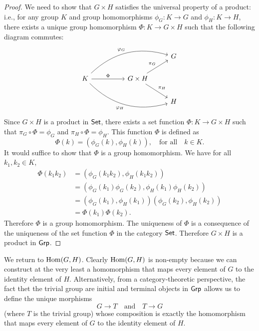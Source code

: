 \begin{proof}
    We need to show that \(G \times H\) satisfies the universal property of a
    product: i.e., for any group \(K\) and group homomorphisms \(\phi_G: K \to
    G\) and \(\phi_H: K \to H\), there exists a unique group homomorphism
    \(\Phi: K \to G \times H\) such that the following diagram commutes:
    \[
        \begin{tikzcd}
            &  &                                                    & G \\
        K \arrow[rr, "\Phi"] \arrow[rrru, "\phi_G", bend left] \arrow[rrrd, "\phi_H"', bend right] &  & G \times H \arrow[rd, "\pi_H"] \arrow[ru, "\pi_G"] &   \\
                    &  &                                                    & H
        \end{tikzcd}
    \]
    Since \(G \times H\) is a product in \(\mathsf{Set}\), there exists a set
    function \(\Phi: K \to G \times H\) such that \(\pi_G \circ \Phi = \phi_G\)
    and \(\pi_H \circ \Phi = \phi_H\). This function \(\Phi\) is defined as
    \[
        \Phi(k) = (\phi_G(k), \phi_H(k)), \quad \text{for all} \quad k \in K.
    \]
    It would suffice to show that \(\Phi\) is a group homomorphism. We have for
    all \(k_1, k_2 \in K\),
    \begin{align*}
        \Phi(k_1k_2) & = (\phi_G(k_1k_2), \phi_H(k_1k_2))\\
        & = (\phi_G(k_1)\phi_G(k_2), \phi_H(k_1)\phi_H(k_2))\\
        & = (\phi_G(k_1), \phi_H(k_1))(\phi_G(k_2), \phi_H(k_2))\\
        & = \Phi(k_1)\Phi(k_2).
    \end{align*}
    Therefore \(\Phi\) is a group homomorphism. The uniqueness of \(\Phi\) is a
    consequence of the uniqueness of the set function \(\Phi\) in the category
    \(\mathsf{Set}\). Therefore \(G \times H\) is a product in \(\mathsf{Grp}\).
\end{proof}


\begin{example}
    We return to \(\operatorname{Hom}(G, H)\). Clearly \(\operatorname{Hom}(G, H)\) is non-empty because we
    can construct at the very least a homomorphism that maps every element of
    \(G\) to the identity element of \(H\). Alternatively, from a
    category-theoretic perspective, the fact thet the trivial group are initial
    and terminal objects in \(\mathsf{Grp}\) allows us to define the unique morphisms
    \[
        G \to T \quad \text{and} \quad T \to G
    \]
    (where \(T\) is the trivial group) whose composition is exactly the
    homomorphism that maps every element of \(G\) to the identity element of
    \(H\).
\end{example}

